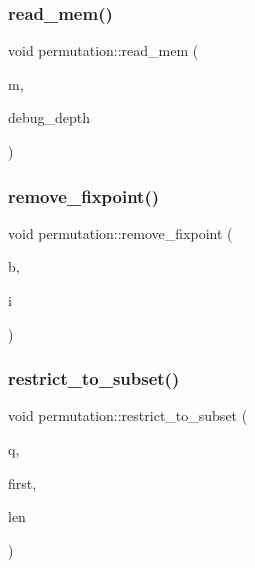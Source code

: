 \subsubsection{\texorpdfstring{read\+\_\+mem()}{read\_mem()}}
{\footnotesize\ttfamily void permutation\+::read\+\_\+mem (\begin{DoxyParamCaption}\item[{\mbox{\hyperlink{classmemory}{memory}} \&}]{m,  }\item[{\mbox{\hyperlink{galois_8h_a09fddde158a3a20bd2dcadb609de11dc}{I\+NT}}}]{debug\+\_\+depth }\end{DoxyParamCaption})}

\mbox{\label{classpermutation_aa7c3d0f95a13e5e3fef703c033e8f570}} 
\subsubsection{\texorpdfstring{remove\+\_\+fixpoint()}{remove\_fixpoint()}}
{\footnotesize\ttfamily void permutation\+::remove\+\_\+fixpoint (\begin{DoxyParamCaption}\item[{\mbox{\hyperlink{classpermutation}{permutation}} \&}]{b,  }\item[{\mbox{\hyperlink{galois_8h_a09fddde158a3a20bd2dcadb609de11dc}{I\+NT}}}]{i }\end{DoxyParamCaption})}

\mbox{\label{classpermutation_a9d9fa353830f05cbfd2080e3e87260d2}} 
\subsubsection{\texorpdfstring{restrict\+\_\+to\+\_\+subset()}{restrict\_to\_subset()}}
{\footnotesize\ttfamily void permutation\+::restrict\+\_\+to\+\_\+subset (\begin{DoxyParamCaption}\item[{\mbox{\hyperlink{classpermutation}{permutation}} \&}]{q,  }\item[{\mbox{\hyperlink{galois_8h_a09fddde158a3a20bd2dcadb609de11dc}{I\+NT}}}]{first,  }\item[{\mbox{\hyperlink{galois_8h_a09fddde158a3a20bd2dcadb609de11dc}{I\+NT}}}]{len }\end{DoxyParamCaption})}

